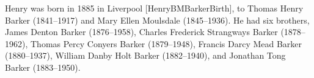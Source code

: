 

Henry was born in 1885 in Liverpool [HenryBMBarkerBirth],  to Thomas Henry Barker (1841--1917) and Mary Ellen Moulsdale (1845--1936). He had six brothers,  James Denton Barker (1876--1958), Charles Frederick Strangways Barker (1878--1962), Thomas Percy Conyers Barker (1879--1948), Francis Darcy Mead Barker (1880--1937), William Danby Holt Barker (1882--1940), and Jonathan Tong Barker (1883--1950).

